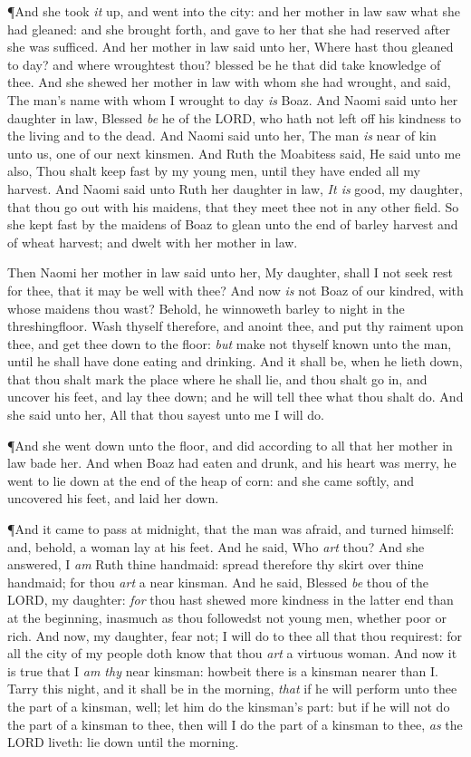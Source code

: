 \documentclass[11pt,letterpaper,oneside]{memoir}
\begin{document}
\P And she took \emph{it} up, and went into the city: and her mother
in law saw what she had gleaned: and she brought forth, and gave to
her that she had reserved after she was sufficed.  And her mother in
law said unto her, Where hast thou gleaned to day? and where
wroughtest thou? blessed be he that did take knowledge of thee. And
she shewed her mother in law with whom she had wrought, and said, The
man's name with whom I wrought to day \emph{is} Boaz.  And Naomi said
unto her daughter in law, Blessed \emph{be} he of the \textsc{LORD},
who hath not left off his kindness to the living and to the dead. And
Naomi said unto her, The man \emph{is} near of kin unto us, one of our
next kinsmen.  And Ruth the Moabitess said, He said unto me also, Thou
shalt keep fast by my young men, until they have ended all my harvest.
And Naomi said unto Ruth her daughter in law, \emph{It is} good, my
daughter, that thou go out with his maidens, that they meet thee not
in any other field.  So she kept fast by the maidens of Boaz to glean
unto the end of barley harvest and of wheat harvest; and dwelt with
her mother in law.

Then Naomi her mother in law said unto her, My daughter, shall I not
seek rest for thee, that it may be well with thee?  And now \emph{is}
not Boaz of our kindred, with whose maidens thou wast? Behold, he
winnoweth barley to night in the threshingfloor.  Wash thyself
therefore, and anoint thee, and put thy raiment upon thee, and get
thee down to the floor: \emph{but} make not thyself known unto the
man, until he shall have done eating and drinking.  And it shall be,
when he lieth down, that thou shalt mark the place where he shall lie,
and thou shalt go in, and uncover his feet, and lay thee down; and he
will tell thee what thou shalt do.  And she said unto her, All that
thou sayest unto me I will do.

\P And she went down unto the floor, and did according to all that
her mother in law bade her.  And when Boaz had eaten and drunk, and
his heart was merry, he went to lie down at the end of the heap of
corn: and she came softly, and uncovered his feet, and laid her down.

\P And it came to pass at midnight, that the man was afraid, and
turned himself: and, behold, a woman lay at his feet.  And he said,
Who \emph{art} thou? And she answered, I \emph{am} Ruth thine
handmaid: spread therefore thy skirt over thine handmaid; for thou
\emph{art} a near kinsman.  And he said, Blessed \emph{be} thou of the
\textsc{LORD}, my daughter: \emph{for} thou hast shewed more kindness
in the latter end than at the beginning, inasmuch as thou followedst
not young men, whether poor or rich.  And now, my daughter, fear not;
I will do to thee all that thou requirest: for all the city of my
people doth know that thou \emph{art} a virtuous woman.  And now it is
true that I \emph{am thy} near kinsman: howbeit there is a kinsman
nearer than I.  Tarry this night, and it shall be in the morning,
\emph{that} if he will perform unto thee the part of a kinsman, well;
let him do the kinsman's part: but if he will not do the part of a
kinsman to thee, then will I do the part of a kinsman to thee,
\emph{as} the \textsc{LORD} liveth: lie down until the morning.
\end{document}
